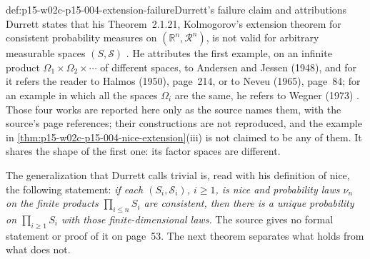 \begin{hbwarning}{def:p15-w02c-p15-004-extension-failure}{Durrett's failure claim and attributions}
Durrett states that his Theorem~2.1.21, Kolmogorov's extension theorem for
consistent probability measures on \((\mathbb R^n,\mathcal R^n)\), is not
valid for arbitrary measurable spaces \((S,\mathcal S)\)
\cite[p.~53]{DurrettPTEAuthor2019}. He attributes the first example, on an
infinite product \(\Omega_1\times\Omega_2\times\cdots\) of different
spaces, to Andersen and Jessen (1948), and for it refers the reader to
Halmos (1950), page~214, or to Neveu (1965), page~84; for an example in
which all the spaces \(\Omega_i\) are the same, he refers to Wegner (1973)
\cite[p.~53]{DurrettPTEAuthor2019}. Those four works are reported here
only as the source names them, with the source's page references; their
constructions are not reproduced, and the example in
\cref{thm:p15-w02c-p15-004-nice-extension}(iii) is not claimed to be any
of them. It shares the shape of the first one: its factor spaces are
different.
\end{hbwarning}

The generalization that Durrett calls trivial is, read with his definition
of nice, the following statement: \emph{if each \((S_i,\mathcal S_i)\),
\(i\geq1\), is nice and probability laws \(\nu_n\) on the finite products
\(\prod_{i\leq n}S_i\) are consistent, then there is a unique probability
on \(\prod_{i\geq1}S_i\) with those finite-dimensional laws.} The source
gives no formal statement or proof of it on page~53. The next theorem
separates what holds from what does not.

